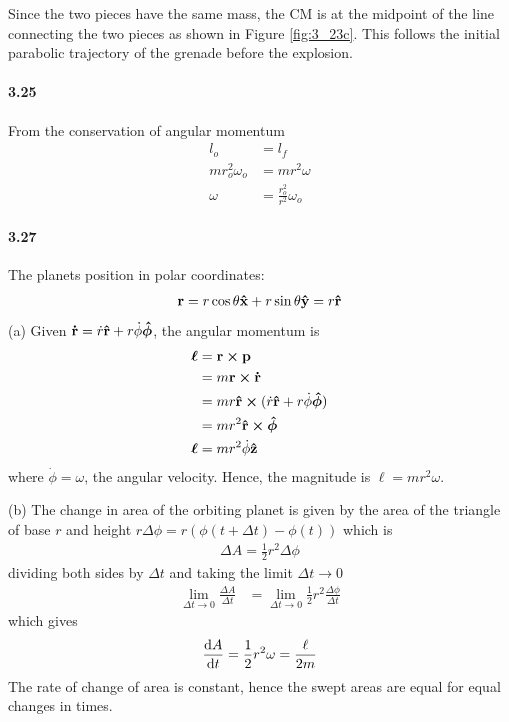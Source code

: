 \documentclass[../problems.tex]{subfiles}
\begin{document}
Since the two pieces have the same mass, the CM is at the midpoint of the line connecting the two
pieces as shown in Figure \ref{fig:3_23c}. This follows the initial parabolic trajectory of the
grenade before the explosion.

\paragraph{3.25}
From the conservation of angular momentum
\begin{align*}
    l_o &= l_f \\
    m r_o^2 \omega_o &= m r^2 \omega \\
    \omega &= \frac{r_o^2}{r^2} \omega_o
\end{align*}

\paragraph{3.27}
The planets position in polar coordinates:
\begin{align*}
    \vb{r} = r\cos\theta \vu{x} + r\sin\theta \vu{y} = r \vu{r}
\end{align*}
(a) Given $\vb{\dot{r}} = \dot{r} \vu{r} + r \dot{\phi} \vu*{\phi}$, the angular momentum is
\begin{align*}
    \vb*{\ell} &= \vb{r} \cross \vb{p} \\
    &= m \vb{r} \cross \vb{\dot{r}} \\
    &= mr \vu{r} \cross (\dot{r} \vu{r} + r \dot{\phi} \vu*{\phi}) \\
    &= mr^2 \vu{r} \cp \vu*{\phi} \\
    \vb*{\ell} &= m r^2 \dot{\phi} \vu{z} 
\end{align*}
where $\dot \phi = \omega$, the angular velocity. Hence, the magnitude is $\ell = mr^2 \omega$.

(b) The change in area of the orbiting planet is given by the area of the triangle of base $r$ and
height $r\Delta \phi = r(\phi(t+\Delta t) - \phi(t))$ which is
\begin{align*}
    \Delta A = \frac{1}{2} r^2 \Delta \phi
\end{align*}
dividing both sides by $\Delta t$ and taking the limit $\Delta t \to 0$
\begin{align*}
    \lim_{\Delta t \to 0} \frac{\Delta A}{\Delta t} 
    &= \lim_{\Delta t \to 0} \frac{1}{2} r^2 \frac{\Delta \phi}{\Delta t}
\end{align*}
which gives
\begin{align*}
    \dv{A}{t} = \frac{1}{2} r^2 \omega = \frac{\ell}{2m}
\end{align*}
The rate of change of area is constant, hence the swept areas are equal for equal changes in times.
\end{document}
